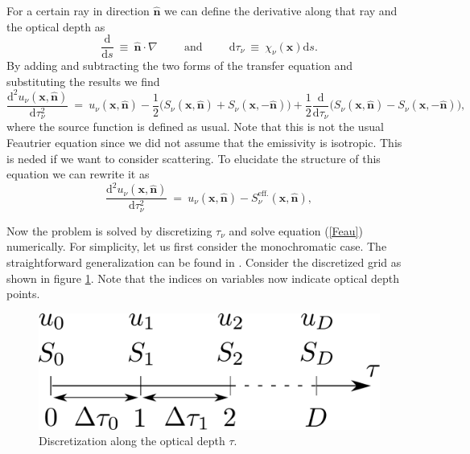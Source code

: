 \documentclass[]{article}
\newcommand{\D}{\text{d}}
\begin{document}
For a certain ray in direction $\hat{\textbf{n}}$ we can define the derivative along that ray and the optical depth as
\begin{equation}
\frac{\D}{\D s} \ \equiv \ \hat{\textbf{n}} \cdot \nabla \hspace{1cm} \text{and} \hspace{1cm} \D\tau_{\nu} \ \equiv \ \chi_{\nu}(\textbf{x}) \D s.
\end{equation}
By adding and subtracting the two forms of the transfer equation and substituting the results we find
\begin{equation}
\frac{\D^{2} u_{\nu}(\textbf{x},\hat{\textbf{n}})}{\D \tau_{\nu}^{2}} \ = \ u_{\nu}(\textbf{x},\hat{\textbf{n}}) - \frac{1}{2}\big( S_{\nu}(\textbf{x},\hat{\textbf{n}}) + S_{\nu}(\textbf{x},-\hat{\textbf{n}}) \big) + \frac{1}{2} \frac{\D}{\D\tau_{\nu}} \big( S_{\nu}(\textbf{x},\hat{\textbf{n}}) -  S_{\nu}(\textbf{x},-\hat{\textbf{n}}) \big) ,
\label{Feau}
\end{equation}
where the source function is defined as usual. Note that this is not the usual Feautrier equation since we did not assume that the emissivity is isotropic. This is neded if we want to consider scattering. To elucidate the structure of this equation we can rewrite it as
\begin{equation}
\frac{\D^{2} u_{\nu}(\textbf{x},\hat{\textbf{n}})}{\D \tau_{\nu}^{2}} \ = \ u_{\nu}(\textbf{x},\hat{\textbf{n}}) - S_{\nu}^{\text{eff.}}(\textbf{x},\hat{\textbf{n}}) ,
\end{equation}


\bigskip

Now the problem is solved by discretizing $\tau_{\nu}$ and solve equation (\ref{Feau}) numerically. For simplicity, let us first consider the monochromatic case. The straightforward generalization can be found in \cite{Mihalas_s, MihalasMihalas}. Consider the discretized grid as shown in figure \ref{grid}. Note that the indices on variables now indicate optical depth points.
\begin{figure}[H]
	\centering
	\includegraphics[scale=.3]{Images/grid.pdf}
	\caption{Discretization along the optical depth $\tau$.}
	\label{grid}
\end{figure}
\end{document}
